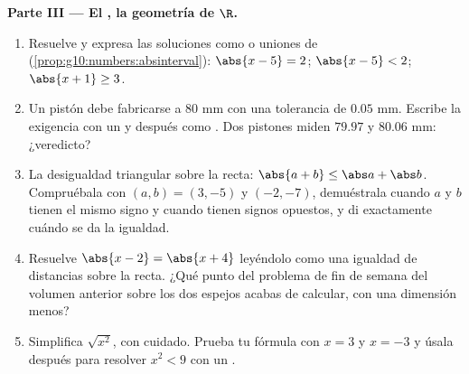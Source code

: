 \begin{problem}
\medskip
\noindent\textbf{Parte III --- El , la geometría de
$\R$.}
\begin{enumerate}[resume]
  \item Resuelve y expresa las soluciones como  o uniones de
         (\cref{prop:g10:numbers:absinterval}):
        $\abs{x - 5} = 2$; \quad $\abs{x - 5} < 2$; \quad
        $\abs{x + 1} \geq 3$.
  \item Un pistón debe fabricarse a $80$ mm con una tolerancia de
        $0.05$ mm. Escribe la exigencia con un  y después
        como . Dos pistones miden $79.97$ y $80.06$ mm:
        ¿veredicto?
  \item La desigualdad triangular sobre la recta:
        $\abs{a + b} \leq \abs a + \abs b$. Compruébala con
        $(a, b) = (3, -5)$ y $(-2, -7)$, demuéstrala cuando $a$ y $b$
        tienen el mismo signo y cuando tienen signos opuestos, y di
        exactamente cuándo se da la igualdad.
  \item Resuelve $\abs{x - 2} = \abs{x + 4}$ leyéndolo como una igualdad
        de distancias sobre la recta. ¿Qué punto del problema de fin de
        semana del volumen anterior sobre los dos espejos acabas de
        calcular, con una dimensión menos?
  \item Simplifica $\sqrt{x^2}$, con cuidado. Prueba tu fórmula con
        $x = 3$ y $x = -3$ y úsala después para resolver $x^2 < 9$ con un
        .
\end{enumerate}


\end{problem}
